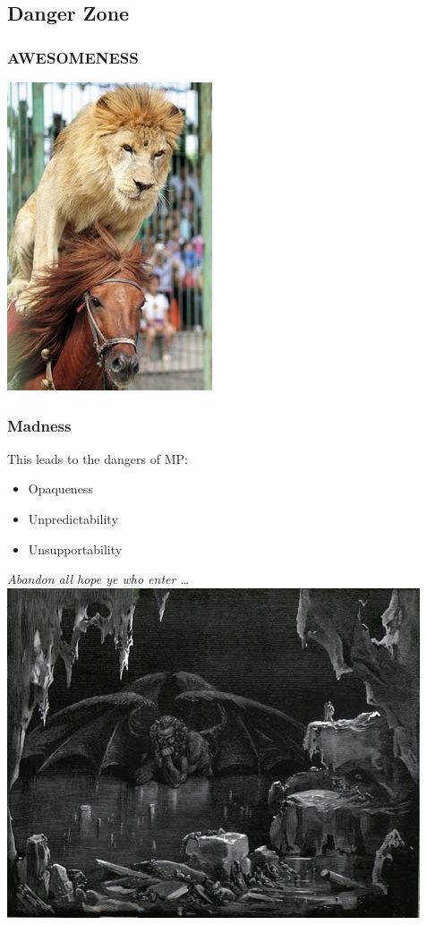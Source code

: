 \documentclass[slidestop,compress,mathserif]{beamer}
\begin{document}
\subsection{Danger Zone} %
\label{sub:danger_zone}

\begin{frame}
		\frametitle{AWESOMENESS}
		\begin{center}
			\includegraphics[scale=0.45]{img/lion_horse.jpg}
		\end{center}			
\end{frame}

\begin{frame}
	\frametitle{Madness}
	This leads to the dangers of MP:
	\begin{itemize}
		\item Opaqueness
		\item Unpredictability
		\item Unsupportability
	\end{itemize}
	\begin{center}
			\emph{Abandon all hope ye who enter \ldots}
		\includegraphics[scale=0.45]{img/dante.jpg}		
	\end{center}
\end{frame}
\end{document}
